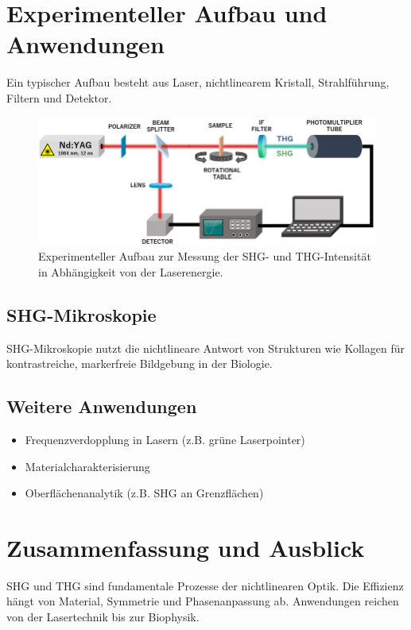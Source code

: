 \documentclass[9pt,a4paper,twocolumn,twoside]{tau-class/tau}
\begin{document}

\section{Experimenteller Aufbau und Anwendungen}
Ein typischer Aufbau besteht aus Laser, nichtlinearem Kristall, Strahlführung, Filtern und Detektor.

\begin{figure}[!ht]
\centering
\includegraphics[width=0.7\columnwidth]{../praes/Images/Experimental-setup-measuring-SHG-and-THG-intensity-relative-to-laser-energy.png}
\caption{Experimenteller Aufbau zur Messung der SHG- und THG-Intensität in Abhängigkeit von der Laserenergie.\cite{ResearchGate2025}}
\end{figure}

\subsection{SHG-Mikroskopie}
SHG-Mikroskopie nutzt die nichtlineare Antwort von Strukturen wie Kollagen für kontrastreiche, markerfreie Bildgebung in der Biologie.

\subsection{Weitere Anwendungen}
\begin{itemize}
    \item Frequenzverdopplung in Lasern (z.B. grüne Laserpointer)
    \item Materialcharakterisierung
    \item Oberflächenanalytik (z.B. SHG an Grenzflächen)
\end{itemize}


\section{Zusammenfassung und Ausblick}
SHG und THG sind fundamentale Prozesse der nichtlinearen Optik. Die Effizienz hängt von Material, Symmetrie und Phasenanpassung ab. Anwendungen reichen von der Lasertechnik bis zur Biophysik.
\end{document}
